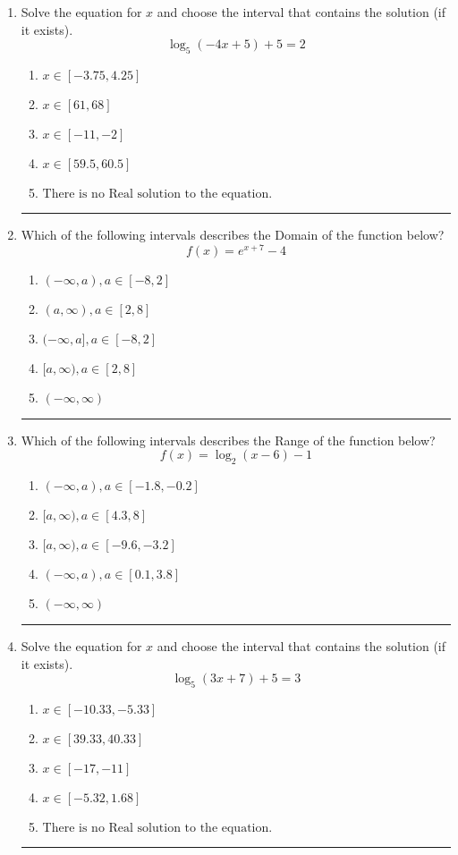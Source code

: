 \documentclass[14pt]{extbook}
\newcommand{\litem}[1]{\item#1\hspace*{-1cm}\rule{\textwidth}{0.4pt}}
\begin{document}
\begin{enumerate}
{\begin{enumerate}[label=\Alph*.]
\end{enumerate} }
\litem{
Solve the equation for $x$ and choose the interval that contains the solution (if it exists).\[ \log_{5}{(-4x+5)}+5 = 2 \]\begin{enumerate}[label=\Alph*.]
\item \( x \in [-3.75, 4.25] \)
\item \( x \in [61, 68] \)
\item \( x \in [-11, -2] \)
\item \( x \in [59.5, 60.5] \)
\item \( \text{There is no Real solution to the equation.} \)

\end{enumerate} }
\litem{
Which of the following intervals describes the Domain of the function below?\[ f(x) = e^{x+7}-4 \]\begin{enumerate}[label=\Alph*.]
\item \( (-\infty, a), a \in [-8, 2] \)
\item \( (a, \infty), a \in [2, 8] \)
\item \( (-\infty, a], a \in [-8, 2] \)
\item \( [a, \infty), a \in [2, 8] \)
\item \( (-\infty, \infty) \)

\end{enumerate} }
\litem{
Which of the following intervals describes the Range of the function below?\[ f(x) = \log_2{(x-6)}-1 \]\begin{enumerate}[label=\Alph*.]
\item \( (-\infty, a), a \in [-1.8, -0.2] \)
\item \( [a, \infty), a \in [4.3, 8] \)
\item \( [a, \infty), a \in [-9.6, -3.2] \)
\item \( (-\infty, a), a \in [0.1, 3.8] \)
\item \( (-\infty, \infty) \)

\end{enumerate} }
\litem{
Solve the equation for $x$ and choose the interval that contains the solution (if it exists).\[ \log_{5}{(3x+7)}+5 = 3 \]\begin{enumerate}[label=\Alph*.]
\item \( x \in [-10.33, -5.33] \)
\item \( x \in [39.33, 40.33] \)
\item \( x \in [-17, -11] \)
\item \( x \in [-5.32, 1.68] \)
\item \( \text{There is no Real solution to the equation.} \)


\end{enumerate}}
\end{enumerate}
\end{document}

